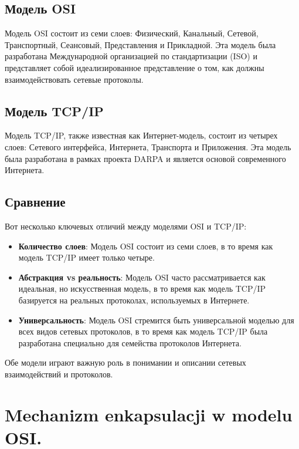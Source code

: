 \subsection{Модель OSI}

Модель OSI состоит из семи слоев: Физический, Канальный, Сетевой, Транспортный, Сеансовый, Представления и Прикладной. Эта модель была разработана Международной организацией по стандартизации (ISO) и представляет собой идеализированное представление о том, как должны взаимодействовать сетевые протоколы.

\subsection{Модель TCP/IP}

Модель TCP/IP, также известная как Интернет-модель, состоит из четырех слоев: Сетевого интерфейса, Интернета, Транспорта и Приложения. Эта модель была разработана в рамках проекта DARPA и является основой современного Интернета.

\subsection{Сравнение}

Вот несколько ключевых отличий между моделями OSI и TCP/IP:

\begin{itemize}
\item \textbf{Количество слоев}: Модель OSI состоит из семи слоев, в то время как модель TCP/IP имеет только четыре.
\item \textbf{Абстракция vs реальность}: Модель OSI часто рассматривается как идеальная, но искусственная модель, в то время как модель TCP/IP базируется на реальных протоколах, используемых в Интернете.
\item \textbf{Универсальность}: Модель OSI стремится быть универсальной моделью для всех видов сетевых протоколов, в то время как модель TCP/IP была разработана специально для семейства протоколов Интернета.
\end{itemize}

Обе модели играют важную роль в понимании и описании сетевых взаимодействий и протоколов.



\section{Mechanizm enkapsulacji w modelu OSI.}

